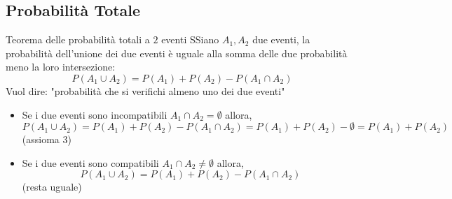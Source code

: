 \documentclass{article}  %
\theoremstyle{definition}
\begin{document}
\subsection{Probabilità Totale}
\begin{theorem}{Teorema delle probabilità totali a $2$ eventi}
	SSiano $A_1,A_2$ due eventi, la probabilità dell'unione dei due eventi è uguale alla somma delle due probabilità meno la loro intersezione:
	\[
		P(A_1 \cup A_2)=P(A_1)+P(A_2)-P(A_1 \cap A_2)
	\]
	Vuol dire: "probabilità che si verifichi almeno uno dei due eventi"
\end{theorem}

\begin{itemize}
	\item Se i due eventi sono incompatibili $A_1 \cap A_2 = \emptyset$ allora,
	      \[
		      P(A_1 \cup A_2)=P(A_1)+P(A_2)-P(A_1 \cap A_2)=P(A_1)+P(A_2)-\emptyset =P(A_1)+P(A_2)
	      \]
	      (assioma 3)
	\item Se i due eventi sono compatibili $A_1 \cap A_2 \neq \emptyset$ allora,
	      \[
		      P(A_1 \cup A_2)=P(A_1)+P(A_2)-P(A_1 \cap A_2)
	      \]
	      (resta uguale)
\end{itemize}
\end{document}
